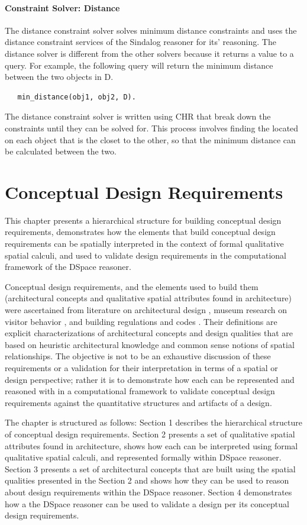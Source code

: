 \documentclass[12pt]{ucthesis}
\begin{document}
\subsubsection{Constraint Solver: Distance}
The distance constraint solver solves minimum distance constraints and uses the distance constraint services of the Sindalog \cite{sindalog} reasoner for its' reasoning. The distance solver is different from the other solvers because it returns a value to a query. For example, the following query will return the minimum distance between the two objects in D.
\begin{verbatim}
   min_distance(obj1, obj2, D). 
\end{verbatim}

The distance constraint solver is written using CHR that break down the constraints until they can be solved for. This process involves finding the located on each object that is the closet to the other, so that the minimum distance can be calculated between the two. 


\chapter{Conceptual Design Requirements}
This chapter presents a hierarchical structure for building conceptual design requirements, demonstrates how the elements that build conceptual design requirements can be spatially interpreted in the context of formal qualitative spatial calculi, and used to validate design requirements in the computational framework of the DSpace reasoner. 

Conceptual design requirements, and the elements used to build them (architectural concepts and qualitative spatial attributes found in architecture) were ascertained from literature on architectural design \cite{tbd}, museum research on visitor behavior \cite{tbd}, and building regulations and codes \cite{tbd}. Their definitions are explicit characterizations of architectural concepts and design qualities that are based on heuristic architectural knowledge and common sense notions of spatial relationships. The objective is not to be an exhaustive discussion of these requirements or a validation for their interpretation in terms of a spatial or design perspective; rather it is to demonstrate how each can be represented and reasoned with in a computational framework to validate conceptual design requirements against the quantitative structures and artifacts of a design. 

The chapter is structured as follows: Section 1 describes the hierarchical structure of conceptual design requirements. Section 2 presents a set of qualitative spatial attributes found in architecture, shows how each can be interpreted using formal qualitative spatial calculi, and represented formally within DSpace reasoner. Section 3 presents a set of architectural concepts that are built using the spatial qualities presented in the Section 2 and shows how they can be used to reason about design requirements within the DSpace reasoner. Section 4 demonstrates how a the DSpace reasoner can be used to validate a design per its conceptual design requirements.
\end{document}
